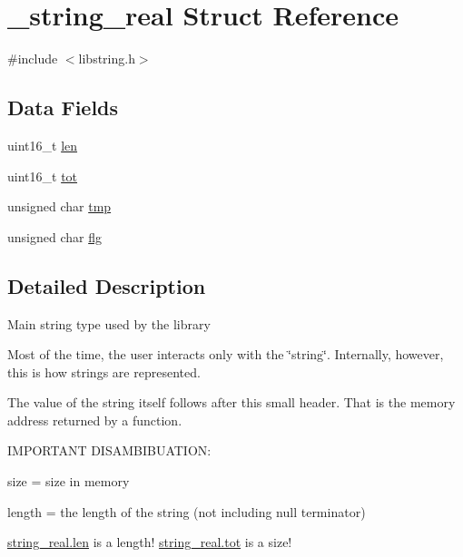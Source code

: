 \hypertarget{struct__string__real}{\section{\-\_\-string\-\_\-real Struct Reference}
\label{struct__string__real}
}


{\ttfamily \#include $<$libstring.\-h$>$}

\subsection*{Data Fields}
\begin{DoxyCompactItemize}
\item 
uint16\-\_\-t \hyperlink{struct__string__real_a4c51041b496d561d8ea8c8af4aa34ea5}{len}
\item 
uint16\-\_\-t \hyperlink{struct__string__real_a0a2aeea98f557b0e98e15aa42414e855}{tot}
\item 
unsigned char \hyperlink{struct__string__real_a205f432017baaaf2b429a5c835510152}{tmp}
\item 
unsigned char \hyperlink{struct__string__real_ac23d3f9fe5d59437dece0bc99488ef85}{flg}
\end{DoxyCompactItemize}


\subsection{Detailed Description}
Main string type used by the library

Most of the time, the user interacts only with the \char`\"{}string\char`\"{}. Internally, however, this is how strings are represented.

The value of the string itself follows after this small header. That is the memory address returned by a function.

I\-M\-P\-O\-R\-T\-A\-N\-T D\-I\-S\-A\-M\-B\-I\-B\-U\-A\-T\-I\-O\-N\-:


\begin{DoxyItemize}
\item size = size in memory
\item length = the length of the string (not including null terminator)
\end{DoxyItemize}

\hyperlink{struct__string__real_a4c51041b496d561d8ea8c8af4aa34ea5}{string\-\_\-real.\-len} is a length! \hyperlink{struct__string__real_a0a2aeea98f557b0e98e15aa42414e855}{string\-\_\-real.\-tot} is a size! 

